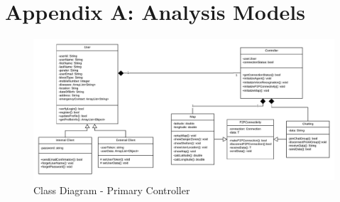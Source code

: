 \documentclass{scrreprt}
\begin{document}
\chapter{Appendix A: Analysis Models}



    
\clearpage


\begin{figure}[ht!]
    \centering
    \includegraphics[angle=90, height=.92\textheight]{img2/ClassD-Torky.pdf}
    \caption{Class Diagram - Primary Controller}
    \label{fig:classdig1}
\end{figure}
\end{document}
